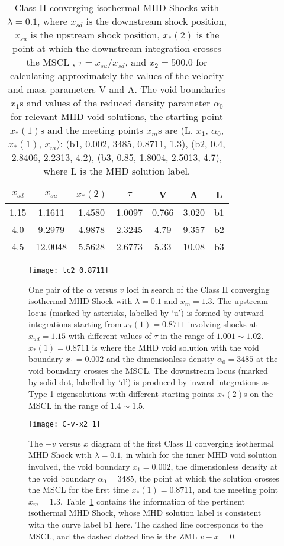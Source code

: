\documentclass[fleqn,usenatbib]{mnras}
\begin{document}
\begin{table}
  \centering
  \caption{Class II converging isothermal MHD Shocks with $\lambda=0.1$, where $x_{sd}$ is the downstream shock position, $x_{su}$ is the upstream shock position, $x_{*}(2)$ is the point at which the downstream integration crosses the MSCL 
, $\tau=x_{su}/x_{sd}$, and $x_{2}=500.0$ for calculating approximately the values of the velocity and mass parameters V and A. The void boundaries $x_{1}$s and values of the reduced density parameter $\alpha_{0}$ for relevant MHD void solutions, the starting point $x_{*}(1)$s and the meeting points $x_{m}$s are (L, $x_{1}$, $\alpha_{0}$, $x_{*}(1)$, $x_{m}$): (b1, 0.002, 3485, 0.8711, 1.3), (b2, 0.4, 2.8406, 2.2313, 4.2), (b3, 0.85, 1.8004, 2.5013, 4.7), where L is the MHD solution label.}
    \begin{tabular}{ccccccc}
    \hline
    $x_{sd}$ & $x_{su}$ & $x_{*}(2)$ & $\tau$ & V & A & L\\
    \hline
    1.15 & 1.1611 & 1.4580 & 1.0097 & 0.766 & 3.020 & b1\\
    4.0 & 9.2979 & 4.9878 & 2.3245 & 4.79 & 9.357 & b2\\
    4.5 & 12.0048 & 5.5628 & 2.6773 & 5.33 & 10.08 & b3\\
    \hline
    \end{tabular}
    \label{t3}
\end{table}    

\begin{figure}
\centering
\texttt{[image: lc2\_0.8711]}
\caption{One pair of the $\alpha$ versus $v$ loci in search of the Class II converging isothermal MHD Shock with $\lambda=0.1$ and $x_{m}=1.3$. The upstream locus (marked by asterisks, labelled by `u') is formed by outward integrations starting from $x_{*}(1)=0.8711$ involving shocks at $x_{ud}=1.15$ with different values of $\tau$ in the range of $1.001\sim 1.02$. $x_{*}(1)=0.8711$ is where the MHD void solution with the void boundary $x_{1}=0.002$ and the dimensionless density $\alpha_{0}=3485$ at the void boundary crosses the MSCL. The downstream locus (marked by solid dot, labelled by `d') is produced by inward integrations as Type 1 eigensolutions with different starting points $x_{*}(2)$s on the MSCL in the range of $1.4\sim 1.5$.}
\label{10}
\end{figure}

\begin{figure}
\centering
\texttt{[image: C-v-x2\_1]}
\caption{The $-v$ versus $x$ diagram of the first Class II converging isothermal MHD Shock with $\lambda=0.1$, in which for the inner MHD void solution involved, the void boundary $x_{1}=0.002$, the dimensionless density at the void boundary $\alpha_{0}=3485$, the point at which the solution crosses the MSCL for the first time $x_{*}(1)=0.8711$, and the meeting point $x_{m}=1.3$. Table~\ref{t3} contains the information of the pertinent isothermal MHD Shock, whose MHD solution label is consistent with the curve label b1 here. The dashed line corresponds to the MSCL, and the dashed dotted line is the ZML $v-x=0$.}
\label{11}
\end{figure}
\end{document}
